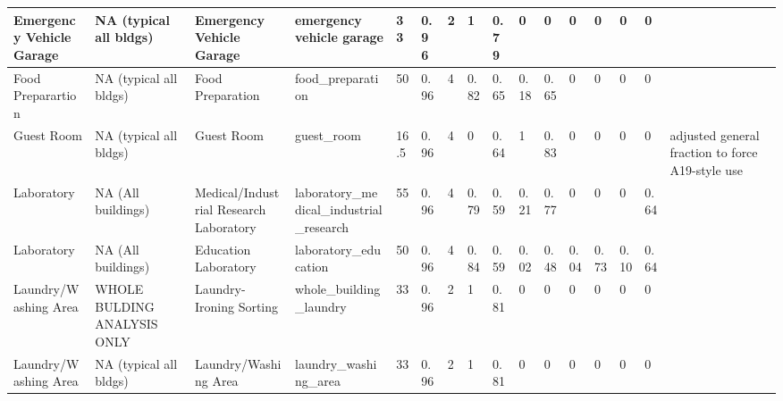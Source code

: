 \begin{center}
\begin{landscape}
\begin{longtable}{|p{0.75in}|p{0.75in}|p{0.75in}|p{0.75in}|p{0.3in}|p{0.3in}|p{0.3in}|p{0.3in}|p{0.3in}|p{0.3in}|p{0.3in}|p{0.3in}|p{0.3in}|p{0.3in}|p{0.3in}|p{0.6in}|}
      Emergency Vehicle Garage                & NA (typical all bldgs)      & Emergency Vehicle Garage                        & emergency vehicle garage                                        & 33   & 0.96 & 2  & 1      & 0.79  & 0     & 0     & 0    & 0    & 0    & 0    &                                                                                       \\ \hline
      Food Preparartion                       & NA (typical all bldgs)      & Food Preparation                                & food\_preparation                                               & 50   & 0.96 & 4  & 0.82   & 0.65  & 0.18  & 0.65  & 0    & 0    & 0    & 0    &                                                                                       \\ \hline
      Guest Room                              & NA (typical all bldgs)      & Guest Room                                      & guest\_room                                                     & 16.5 & 0.96 & 4  & 0      & 0.64  & 1     & 0.83  & 0    & 0    & 0    & 0    & adjusted general fraction to force A19-style use                                      \\ \hline
      Laboratory                              & NA (All buildings)          & Medical/Industrial Research Laboratory          & laboratory\_medical\_industrial\_research                       & 55   & 0.96 & 4  & 0.79   & 0.59  & 0.21  & 0.77  & 0    & 0    & 0    & 0.64 &                                                                                       \\ \hline
      Laboratory                              & NA (All buildings)          & Education Laboratory                            & laboratory\_education                                           & 50   & 0.96 & 4  & 0.84   & 0.59  & 0.02  & 0.48  & 0.04 & 0.73 & 0.10 & 0.64 &                                                                                       \\ \hline
      Laundry/Washing Area                  & WHOLE BULDING ANALYSIS ONLY & Laundry-Ironing  Sorting                        & whole\_building\_laundry                                        & 33   & 0.96 & 2  & 1      & 0.81  & 0     & 0     & 0    & 0    & 0    & 0    &                                                                                       \\ \hline
      Laundry/Washing Area                  & NA (typical all bldgs)      & Laundry/Washing Area                            & laundry\_washing\_area                                          & 33   & 0.96 & 2  & 1      & 0.81  & 0     & 0     & 0    & 0    & 0    & 0    &                                                                                       \\ \hline

\end{longtable}
\end{landscape}
\end{center}

